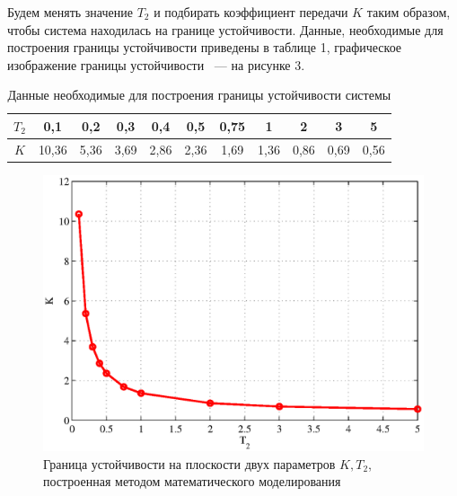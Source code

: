 \documentclass[a4paper,12pt]{article} %
\begin{document}
Будем менять значение $T_2$ и подбирать коэффициент передачи $K$ таким образом, чтобы система находилась на границе устойчивости. Данные, необходимые для построения границы устойчивости приведены в таблице 1, графическое изображение границы устойчивости ~--- на рисунке 3.
\begin{table}[h!]
		\renewcommand{\arraystretch}{1.8} %
		\centering
		\begin{threeparttable}
		\caption{Данные необходимые для построения границы устойчивости системы}
			\begin{tabular}{|c|c|c|c|c|c|c|c|c|c|c|}
				\hline $T_2$ & 0,1 & 0,2 & 0,3 & 0,4 & 0,5 & 0,75 & 1 & 2 & 3 & 5\\
				\hline $K$ & 10,36 & 5,36 & 3,69 & 2,86 & 2,36 & 1,69 & 1,36 & 0,86 & 0,69 & 0,56\\
				\hline
			\end{tabular}	
		\end{threeparttable}
\end{table} 
\begin{figure}[h!]
	\centering
	\includegraphics[width=1\linewidth]{scheme/plot0.eps}
	\caption{Граница устойчивости на плоскости двух параметров $K, T_2$, построенная методом математического моделирования}
\end{figure}
\end{document}
